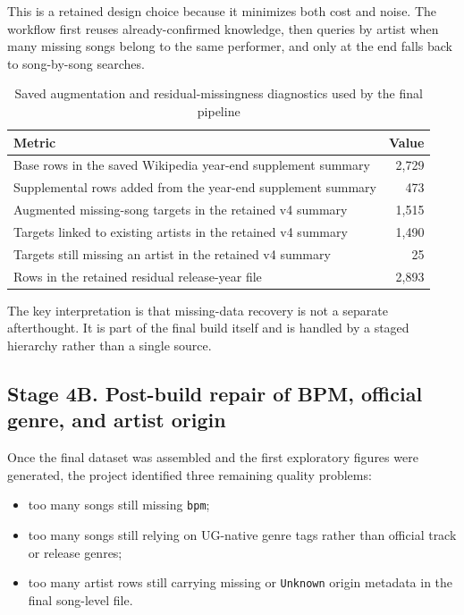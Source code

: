 \documentclass[11pt]{article}
\begin{document}
This is a retained design choice because it minimizes both cost and noise. The
workflow first reuses already-confirmed knowledge, then queries by artist when
many missing songs belong to the same performer, and only at the end falls back
to song-by-song searches.

\begin{table}[H]
\centering
\caption{Saved augmentation and residual-missingness diagnostics used by the final pipeline}
\begin{tabularx}{\textwidth}{Y r}
\toprule
Metric & Value \\
\midrule
Base rows in the saved Wikipedia year-end supplement summary & 2,729 \\
Supplemental rows added from the year-end supplement summary & 473 \\
Augmented missing-song targets in the retained v4 summary & 1,515 \\
Targets linked to existing artists in the retained v4 summary & 1,490 \\
Targets still missing an artist in the retained v4 summary & 25 \\
Rows in the retained residual release-year file & 2,893 \\
\bottomrule
\end{tabularx}
\end{table}

The key interpretation is that missing-data recovery is not a separate afterthought.
It is part of the final build itself and is handled by a staged hierarchy rather
than a single source.

\subsection{Stage 4B. Post-build repair of BPM, official genre, and artist origin}
Once the final dataset was assembled and the first exploratory figures were
generated, the project identified three remaining quality problems:
\begin{itemize}[leftmargin=2em]
\item too many songs still missing \texttt{bpm};
\item too many songs still relying on UG-native genre tags rather than official
track or release genres;
\item too many artist rows still carrying missing or \texttt{Unknown} origin
metadata in the final song-level file.
\end{itemize}
\end{document}
